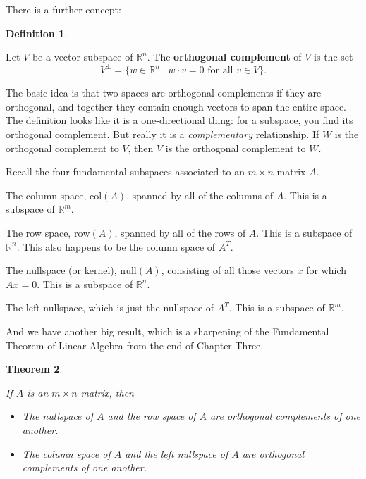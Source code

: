 \documentclass[10pt,]{book}
\newcommand{\terminology}[1]{\textbf{#1}}
\theoremstyle{plain}
\newtheorem{theorem}{Theorem}[chapter]
\theoremstyle{definition}
\newtheorem{definition}[theorem]{Definition}
\numberwithin{equation}{section}
\begin{document}
      There is a further concept:
\begin{definition}\label{definition-2}

        Let \(V\) be a vector subspace of \(\mathbb{R}^n\). The
        \terminology{orthogonal complement} of \(V\) is the set
        \[
          V^{\perp} = \{ w \in \mathbb{R}^n \mid w \cdot v = 0 \text{ for all } v \in V \}.
        \]\end{definition}
\par

      The basic idea is that two spaces are orthogonal complements if they are
      orthogonal, and together they contain enough vectors to span the entire
      space. The definition looks like it is a one-directional thing: for a
      subspace, you find its orthogonal complement. But really it is a
      \emph{complementary} relationship. If \(W\) is the orthogonal
      complement to \(V\), then \(V\) is the orthogonal complement to
      \(W\).
\par

      Recall the four fundamental subspaces associated to an \(m\times n\)
      matrix \(A\).
      
        
          The column space, \(\mathrm{col}(A)\), spanned by all of the
          columns of \(A\). This is a subspace of \(\mathbb{R}^m\).
        
        
          The row space, \(\mathrm{row}(A)\), spanned by all of the rows of
          \(A\). This is a subspace of \(\mathbb{R}^n\). This also happens
          to be the column space of \(A^T\).
        
        
          The nullspace (or kernel), \(\mathrm{null}(A)\), consisting of all
          those vectors \(x\) for which \(Ax=0\). This is a subspace of
          \(\mathbb{R}^n\).
        
        
          The left nullspace, which is just the nullspace of \(A^T\). This is
          a subspace of \(\mathbb{R}^m\).
        
      
\par

      And we have another big result, which is a sharpening of the Fundamental
      Theorem of Linear Algebra from the end of Chapter Three.
\begin{theorem}\label{theorem-8}

        If \(A\) is an \(m\times n\) matrix, then
        \begin{itemize}
\item{}
            The nullspace of \(A\) and the row space of \(A\) are
            orthogonal complements of one another.
          \item{}
            The column space of \(A\) and the left nullspace of \(A\)
            are orthogonal complements of one another.
          \end{itemize}
\end{theorem}
\typeout{************************************************}
\typeout{************************************************}
\end{document}
